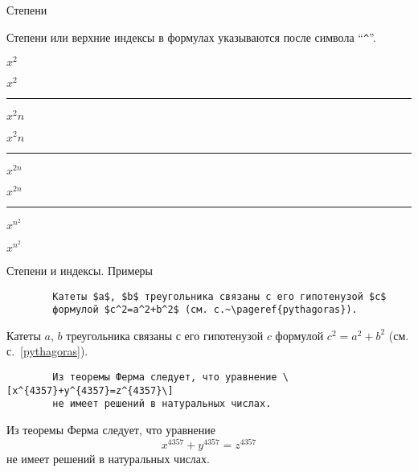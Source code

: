 \begin{frame}[fragile]{Степени}
	\Large
	
	Степени или верхние индексы в формулах указываются после символа ``\texttt{^}''.
	
	\begin{minipage}{0.49\textwidth}
		\texttt{$x^2$}
	\end{minipage}
	\begin{minipage}{0.49\textwidth}
		\begin{center}
			$x^2$
		\end{center}
	\end{minipage}
	\noindent\rule{\textwidth}{1pt}
	\begin{minipage}{0.49\textwidth}
		\texttt{$x^2n$}
	\end{minipage}
	\begin{minipage}{0.49\textwidth}
		\begin{center}
			$x^2n$
		\end{center}
	\end{minipage}
	\noindent\rule{\textwidth}{1pt}
	\begin{minipage}{0.49\textwidth}
		\texttt{$x^{2n}$}
	\end{minipage}
	\begin{minipage}{0.49\textwidth}
		\begin{center}
			$x^{2n}$
		\end{center}
	\end{minipage}
	\noindent\rule{\textwidth}{1pt}
	\begin{minipage}{0.49\textwidth}
		\texttt{$x^{n^2}$}
	\end{minipage}
	\begin{minipage}{0.49\textwidth}
		\begin{center}
			$x^{n^2}$
		\end{center}
	\end{minipage}
\end{frame}


\begin{frame}[fragile]{Степени и индексы. Примеры}
	
	\begin{verbatim}
		Катеты $a$, $b$ треугольника связаны с его гипотенузой $c$
		формулой $c^2=a^2+b^2$ (см. с.~\pageref{pythagoras}).
	\end{verbatim}
	
	Катеты $a$, $b$ треугольника связаны с его гипотенузой $c$
	формулой $c^2=a^2+b^2$ (см. с.~\ref{pythagoras}).
	
	\begin{verbatim}
		Из теоремы Ферма следует, что уравнение \[x^{4357}+y^{4357}=z^{4357}\]
		не имеет решений в натуральных числах.
	\end{verbatim}
	
	Из теоремы Ферма следует, что уравнение
	\[
	x^{4357}+y^{4357}=z^{4357}
	\]
	не имеет решений в натуральных числах.
\end{frame}


